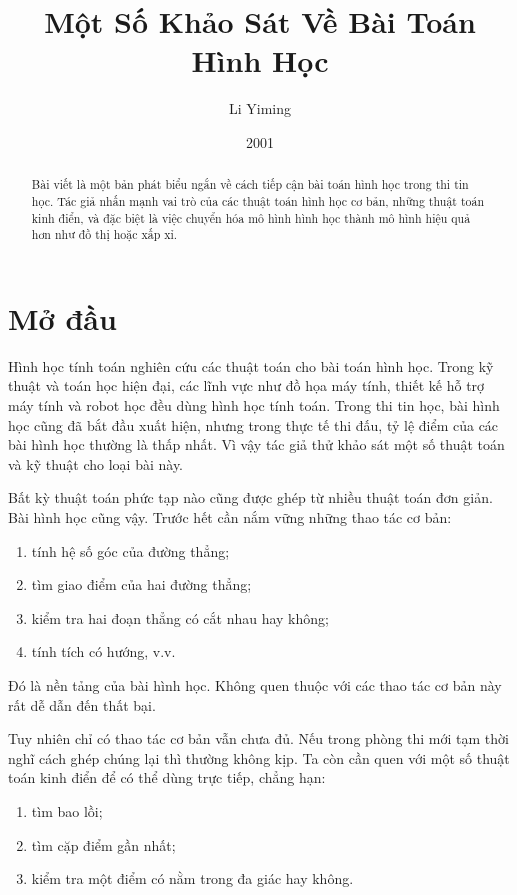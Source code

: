 \documentclass[11pt]{article}
\title{Một Số Khảo Sát Về Bài Toán Hình Học}
\author{Li Yiming}
\date{2001}
\begin{document}
\maketitle


\begin{abstract}
Bài viết là một bản phát biểu ngắn về cách tiếp cận bài toán hình học trong
thi tin học. Tác giả nhấn mạnh vai trò của các thuật toán hình học cơ bản,
những thuật toán kinh điển, và đặc biệt là việc chuyển hóa mô hình hình học
thành mô hình hiệu quả hơn như đồ thị hoặc xấp xỉ.
\end{abstract}

\section{Mở đầu}

Hình học tính toán nghiên cứu các thuật toán cho bài toán hình học. Trong kỹ
thuật và toán học hiện đại, các lĩnh vực như đồ họa máy tính, thiết kế hỗ trợ
máy tính và robot học đều dùng hình học tính toán. Trong thi tin học, bài hình
học cũng đã bắt đầu xuất hiện, nhưng trong thực tế thi đấu, tỷ lệ điểm của các
bài hình học thường là thấp nhất. Vì vậy tác giả thử khảo sát một số thuật
toán và kỹ thuật cho loại bài này.

Bất kỳ thuật toán phức tạp nào cũng được ghép từ nhiều thuật toán đơn giản.
Bài hình học cũng vậy. Trước hết cần nắm vững những thao tác cơ bản:
\begin{enumerate}
  \item tính hệ số góc của đường thẳng;
  \item tìm giao điểm của hai đường thẳng;
  \item kiểm tra hai đoạn thẳng có cắt nhau hay không;
  \item tính tích có hướng, v.v.
\end{enumerate}
Đó là nền tảng của bài hình học. Không quen thuộc với các thao tác cơ bản này
rất dễ dẫn đến thất bại.

Tuy nhiên chỉ có thao tác cơ bản vẫn chưa đủ. Nếu trong phòng thi mới tạm thời
nghĩ cách ghép chúng lại thì thường không kịp. Ta còn cần quen với một số
thuật toán kinh điển để có thể dùng trực tiếp, chẳng hạn:
\begin{enumerate}
  \item tìm bao lồi;
  \item tìm cặp điểm gần nhất;
  \item kiểm tra một điểm có nằm trong đa giác hay không.
\end{enumerate}
\end{document}
